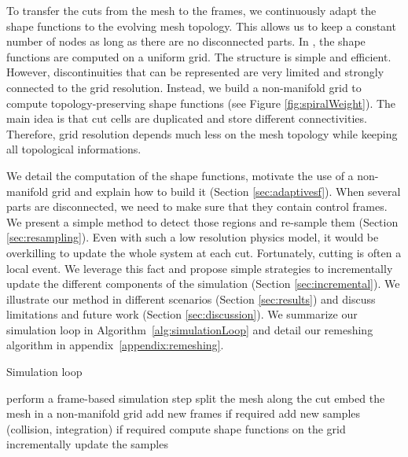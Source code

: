 To transfer the cuts from the mesh to the frames, we continuously adapt the shape functions to the evolving mesh topology. This allows us to keep a constant number of nodes as long as there are no disconnected parts. In \cite{Faure2011}, the shape functions are computed on a uniform grid. The structure is simple and efficient. However, discontinuities that can be represented are very limited and strongly connected to the grid resolution. Instead, we build a non-manifold grid to compute topology-preserving shape functions (see Figure \ref{fig:spiralWeight}). The main idea is that cut cells are duplicated and store different connectivities. Therefore, grid resolution depends much less on the mesh topology while keeping all topological informations.

We detail the computation of the shape functions, motivate the use of a non-manifold grid and explain how to build it (Section \ref{sec:adaptivesf}). When several parts are disconnected, we need to make sure that they contain control frames. We present a simple method to detect those regions and re-sample them (Section \ref{sec:resampling}). Even with such a low resolution physics model, it would be overkilling to update the whole system at each cut. Fortunately, cutting is often a local event. We leverage this fact and propose simple strategies to incrementally update the different components of the simulation (Section \ref{sec:incremental}). We illustrate our method in different scenarios (Section \ref{sec:results}) and discuss limitations and future work (Section \ref{sec:discussion}). We summarize our simulation loop in Algorithm~\ref{alg:simulationLoop} and detail our remeshing algorithm in appendix~\ref{appendix:remeshing}.

\begin{algorithm}[h]
\caption[Frame-based cutting: Simulation loop]{\label{alg:simulationLoop}Simulation loop}
\begin{algorithmic}[0]
	\State perform a frame-based simulation step
	\State split the mesh along the cut
	\State embed the mesh in a non-manifold grid
	\State add new frames if required
	\State add new samples (collision, integration) if required
	\State compute shape functions on the grid
	\State incrementally update the samples
\EndFor
\end{algorithmic}
\end{algorithm}

